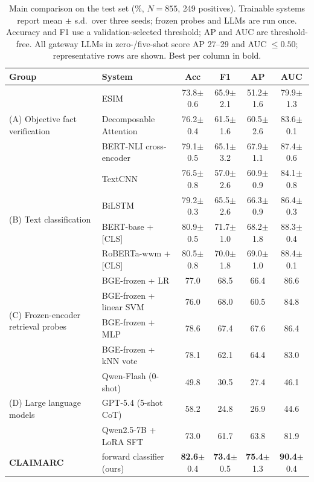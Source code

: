 \documentclass[letterpaper]{article}
\newcommand{\best}[1]{\textbf{#1}}
\newcommand{\std}[1]{{\scriptsize$\pm$#1}}
\begin{document}
\begin{table}[t]
\centering\small
\setlength{\tabcolsep}{7pt}
\begin{tabular}{llcccc}
\toprule
Group & System & Acc & F1 & AP & AUC \\
\midrule
\multirow{3}{*}{(A) Objective fact verification}
 & ESIM & 73.8\std{0.6} & 65.9\std{2.1} & 51.2\std{1.6} & 79.9\std{1.3} \\
 & Decomposable Attention & 76.2\std{0.4} & 61.5\std{1.6} & 60.5\std{2.6} & 83.6\std{0.1} \\
 & BERT-NLI cross-encoder & 79.1\std{0.5} & 65.1\std{3.2} & 67.9\std{1.1} & 87.4\std{0.6} \\
\midrule
\multirow{4}{*}{(B) Text classification}
 & TextCNN & 76.5\std{0.8} & 57.0\std{2.6} & 60.9\std{0.9} & 84.1\std{0.8} \\
 & BiLSTM & 79.2\std{0.3} & 65.5\std{2.6} & 66.3\std{0.9} & 86.4\std{0.3} \\
 & BERT-base + [CLS] & 80.9\std{0.5} & 71.7\std{1.0} & 68.2\std{1.8} & 88.3\std{0.4} \\
 & RoBERTa-wwm + [CLS] & 80.5\std{0.8} & 70.0\std{1.8} & 69.0\std{1.0} & 88.4\std{0.1} \\
\midrule
\multirow{4}{*}{(C) Frozen-encoder retrieval probes}
 & BGE-frozen + LR & 77.0 & 68.5 & 66.4 & 86.6 \\
 & BGE-frozen + linear SVM & 76.0 & 68.0 & 60.5 & 84.8 \\
 & BGE-frozen + MLP & 78.6 & 67.4 & 67.6 & 86.4 \\
 & BGE-frozen + kNN vote & 78.1 & 62.1 & 64.4 & 83.0 \\
\midrule
\multirow{3}{*}{(D) Large language models}
 & Qwen-Flash (0-shot) & 49.8 & 30.5 & 27.4 & 46.1 \\
 & GPT-5.4 (5-shot CoT) & 58.2 & 24.8 & 26.9 & 44.6 \\
 & Qwen2.5-7B + LoRA SFT & 73.0 & 61.7 & 63.8 & 81.9 \\
\midrule
\textbf{CLAIMARC} & forward classifier (ours) & \best{82.6}\std{0.4} & \best{73.4}\std{0.5} & \best{75.4}\std{1.3} & \best{90.4}\std{0.4} \\
\bottomrule
\end{tabular}
\caption{Main comparison on the test set (\%, $N{=}855$, 249 positives). Trainable systems report mean $\pm$ s.d.\ over three seeds; frozen probes and LLMs are run once. Accuracy and F1 use a validation-selected threshold; AP and AUC are threshold-free. All gateway LLMs in zero-/five-shot score AP 27--29 and AUC $\le0.50$; representative rows are shown. Best per column in bold.}
\label{tab:main}
\end{table}
\end{document}
